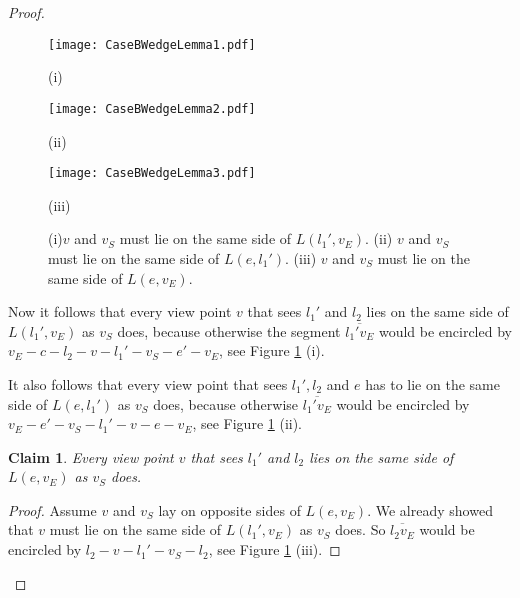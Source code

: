 \documentclass[11pt]{article}
\newtheorem{claim}{Claim}
\begin{document}
\begin{proof}
\begin{figure}[hbtp]\begin{minipage}[t]{0.30\textwidth}
\begin{center}\texttt{[image: CaseBWedgeLemma1.pdf]}

(i)
\end{center}\end{minipage}
\hfill
\begin{minipage}[t]{0.20\textwidth}
\begin{center}\texttt{[image: CaseBWedgeLemma2.pdf]}

(ii)
\end{center}\end{minipage}
\hfill
\begin{minipage}[t]{0.28\textwidth}
\begin{center}\texttt{[image: CaseBWedgeLemma3.pdf]}

(iii)
\end{center}\end{minipage}
\caption{ (i)$v$ and $v_S$ must lie on the same side of $L(l_1',v_E)$.  
(ii) $v$ and $v_S$ must lie on the same side of $L(e,l_1')$.
(iii) $v$ and $v_S$ must lie on the same side of $L(e,v_E)$.}
\label{CaseBWedgeLemma-fig}
\end{figure}


Now it follows that every view point $v$ that sees $l_1'$ and $l_2$ lies on the same side of $L(l_1',v_E)$ as $v_S$ does, because otherwise the segment $\overline{l_1'v_E}$ would be encircled by $v_E-c-l_2-v-l_1'-v_S-e'-v_E$, see Figure \ref{CaseBWedgeLemma-fig} (i).

It also follows that every view point that sees $l_1',l_2$ and $e$ has to lie on the same side of $L(e,l_1')$ as $v_S$ does, because otherwise $\overline{l_1'v_E}$ would be encircled by $v_E-e'-v_S-l_1'-v-e-v_E$, see Figure \ref{CaseBWedgeLemma-fig} (ii).

\begin{claim} \label{l_1l_2-claim} Every view point $v$ that sees $l_1'$ and $l_2$ lies on the same side of $L(e,v_E)$ as $v_S$ does. 
\end{claim}

\begin{proof}
Assume $v$ and $v_S$ lay on opposite sides of  $L(e,v_E)$. We already showed that $v$ must lie on the same side of $L(l_1',v_E)$ as $v_S$ does. So $ \overline{l_2v_E}$ would be encircled by $l_2-v-l_1'-v_S-l_2$, see Figure \ref{CaseBWedgeLemma-fig} (iii).
\end{proof}


\end{proof}
\end{document}
